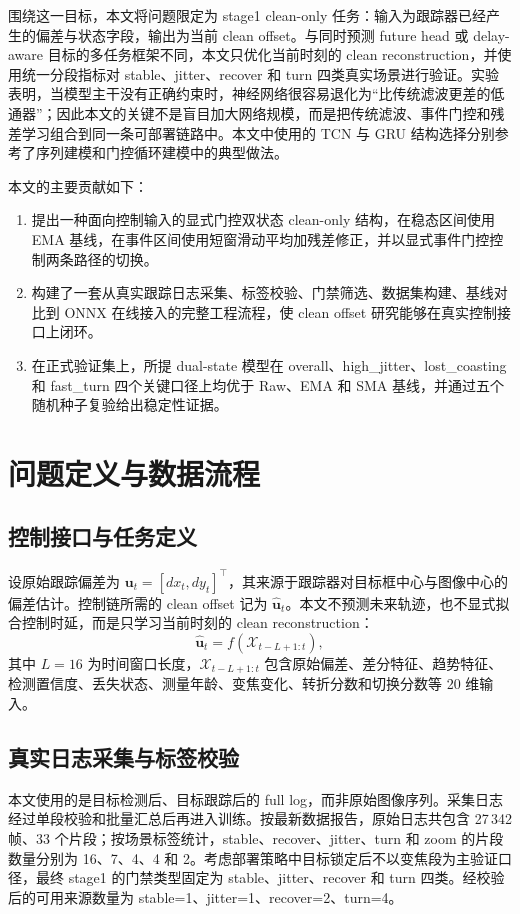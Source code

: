 \documentclass[preprint,12pt]{elsarticle}
\begin{document}
围绕这一目标，本文将问题限定为 stage1 clean-only 任务：输入为跟踪器已经产生的偏差与状态字段，输出为当前 clean offset。与同时预测 future head 或 delay-aware 目标的多任务框架不同，本文只优化当前时刻的 clean reconstruction，并使用统一分段指标对 stable、jitter、recover 和 turn 四类真实场景进行验证。实验表明，当模型主干没有正确约束时，神经网络很容易退化为“比传统滤波更差的低通器”；因此本文的关键不是盲目加大网络规模，而是把传统滤波、事件门控和残差学习组合到同一条可部署链路中。本文中使用的 TCN 与 GRU 结构选择分别参考了序列建模和门控循环建模中的典型做法\cite{bai2018empirical,cho2014learning}。

本文的主要贡献如下：
\begin{enumerate}[label=\arabic*)]
  \item 提出一种面向控制输入的显式门控双状态 clean-only 结构，在稳态区间使用 EMA 基线，在事件区间使用短窗滑动平均加残差修正，并以显式事件门控控制两条路径的切换。
  \item 构建了一套从真实跟踪日志采集、标签校验、门禁筛选、数据集构建、基线对比到 ONNX 在线接入的完整工程流程，使 clean offset 研究能够在真实控制接口上闭环。
  \item 在正式验证集上，所提 dual-state 模型在 overall、high\_jitter、lost\_coasting 和 fast\_turn 四个关键口径上均优于 Raw、EMA 和 SMA 基线，并通过五个随机种子复验给出稳定性证据。
\end{enumerate}

\section{问题定义与数据流程}
\subsection{控制接口与任务定义}
设原始跟踪偏差为 $\mathbf{u}_t=[dx_t,dy_t]^\top$，其来源于跟踪器对目标框中心与图像中心的偏差估计。控制链所需的 clean offset 记为 $\hat{\mathbf{u}}_t$。本文不预测未来轨迹，也不显式拟合控制时延，而是只学习当前时刻的 clean reconstruction：
\begin{equation}
\hat{\mathbf{u}}_t = f(\mathcal{X}_{t-L+1:t}),
\end{equation}
其中 $L=16$ 为时间窗口长度，$\mathcal{X}_{t-L+1:t}$ 包含原始偏差、差分特征、趋势特征、检测置信度、丢失状态、测量年龄、变焦变化、转折分数和切换分数等 20 维输入。

\subsection{真实日志采集与标签校验}
本文使用的是目标检测后、目标跟踪后的 full log，而非原始图像序列。采集日志经过单段校验和批量汇总后再进入训练。按最新数据报告，原始日志共包含 27\,342 帧、33 个片段；按场景标签统计，stable、recover、jitter、turn 和 zoom 的片段数量分别为 16、7、4、4 和 2。考虑部署策略中目标锁定后不以变焦段为主验证口径，最终 stage1 的门禁类型固定为 stable、jitter、recover 和 turn 四类。经校验后的可用来源数量为 stable=1、jitter=1、recover=2、turn=4。
\end{document}
